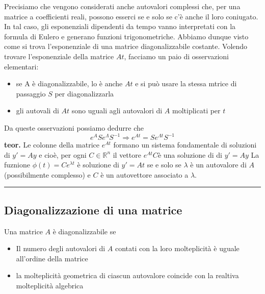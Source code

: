 \newline
Precisiamo che vengono considerati anche autovalori complessi che, per una matrice a coefficienti reali, possono esserci se e solo se c'è anche il loro coniugato. In tal caso, gli esponenziali dipendenti da tempo vanno interpretati con la formula di Eulero e generano funzioni trigonometriche.\newline
\newline
Abbiamo dunque visto come si trova l'esponenziale di una matrice diagonalizzabile costante. Volendo trovare l'esponenziale della matrice $At$, facciamo un paio di osservazioni elementari:
\begin{itemize}
    \item se A è diagonalizzabile, lo è anche $At$ e si può usare la stessa mtrice di passaggio $S$ per diagonalizzarla
    \item gli autovali di $At$ sono uguali agli autovalori di $A$ moltiplicati per $t$
\end{itemize}
Da queste osservazioni possiamo dedurre che
\[
    e^A  S e^{\Lambda}S^{-1} \Rightarrow  e^{At} = S e^{\Lambda t} S^{-1}
\]
\textbf{teor.} Le colonne della matrice $e^{At}$ formano un sistema fondamentale di soluzioni di $y' = Ay$ e cioè, per ogni $C \in \mathbb{R}^n$ il vettore $e^{At} C$è una soluzione di di $y'=Ay$\newline
\newline
La fuznione $\phi(t) = C e^{\lambda t} $ è soluzione di $y'=At$ se e solo se $\lambda$ è un autovalore di $A$ (possibilmente complesso) e $C$ è un autovettore associato a $\lambda$.\newline
\rule{\textwidth}{0,4pt}
\subsection*{Diagonalizzazione di una matrice}
Una matrice $A$ è diagonalizzabile se
\begin{itemize}
    \item Il numero degli autovalori di $A$ contati con la loro molteplicità è uguale all'ordine della matrice
    \item la molteplicità geometrica di ciascun autovalore coincide  con la realtiva molteplicità algebrica
\end{itemize}

